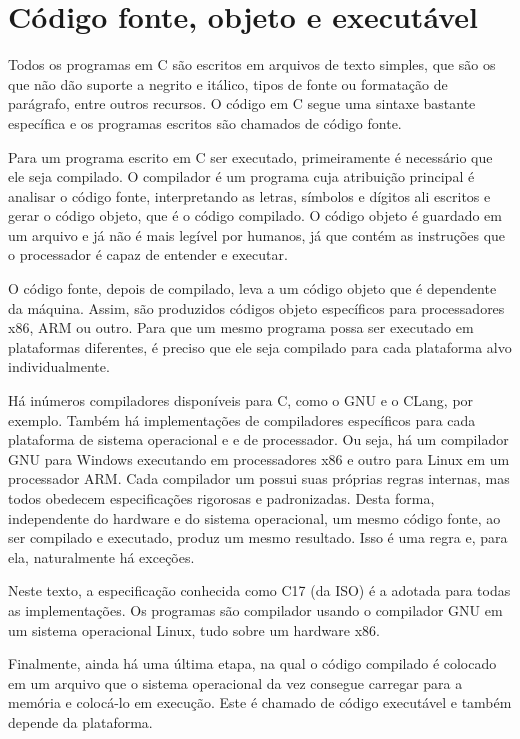 \documentclass[
  11pt,
  a4paper,
]{scrbook}
\begin{document}
\section{Código fonte, objeto e
executável}\label{cuxf3digo-fonte-objeto-e-executuxe1vel}

Todos os programas em C são escritos em arquivos de texto simples, que
são os que não dão suporte a negrito e itálico, tipos de fonte ou
formatação de parágrafo, entre outros recursos. O código em C segue uma
sintaxe bastante específica e os programas escritos são chamados de
código fonte.

Para um programa escrito em C ser executado, primeiramente é necessário
que ele seja compilado. O compilador é um programa cuja atribuição
principal é analisar o código fonte, interpretando as letras, símbolos e
dígitos ali escritos e gerar o código objeto, que é o código compilado.
O código objeto é guardado em um arquivo e já não é mais legível por
humanos, já que contém as instruções que o processador é capaz de
entender e executar.

O código fonte, depois de compilado, leva a um código objeto que é
dependente da máquina. Assim, são produzidos códigos objeto específicos
para processadores x86, ARM ou outro. Para que um mesmo programa possa
ser executado em plataformas diferentes, é preciso que ele seja
compilado para cada plataforma alvo individualmente.

Há inúmeros compiladores disponíveis para C, como o GNU e o CLang, por
exemplo. Também há implementações de compiladores específicos para cada
plataforma de sistema operacional e e de processador. Ou seja, há um
compilador GNU para Windows executando em processadores x86 e outro para
Linux em um processador ARM. Cada compilador um possui suas próprias
regras internas, mas todos obedecem especificações rigorosas e
padronizadas. Desta forma, independente do hardware e do sistema
operacional, um mesmo código fonte, ao ser compilado e executado, produz
um mesmo resultado. Isso é uma regra e, para ela, naturalmente há
exceções.

Neste texto, a especificação conhecida como C17 (da ISO) é a adotada
para todas as implementações. Os programas são compilador usando o
compilador GNU em um sistema operacional Linux, tudo sobre um hardware
x86.

Finalmente, ainda há uma última etapa, na qual o código compilado é
colocado em um arquivo que o sistema operacional da vez consegue
carregar para a memória e colocá-lo em execução. Este é chamado de
código executável e também depende da plataforma.
\end{document}
